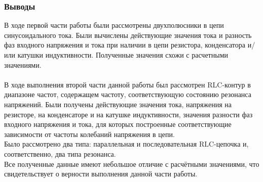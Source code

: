 \documentclass[12pt]{article}
\begin{document}
\subsubsection*{Выводы}
В ходе первой части работы были рассмотрены двухполюсники в цепи синусоидального тока. Были вычислены действующие значения тока и разность фаз входного напряжения и тока при наличии в цепи резистора, конденсатора и/или катушки индуктивности. Полученные значения схожи с расчетными значениями. \\
\ \\
В ходе выполнения второй части данной работы был рассмотрен RLC-контур в диапазоне частот, содержащем частоту, соответствующую состоянию резонанса напряжений. Были получены действующие значения тока, напряжения на резисторе, на конденсаторе и на катушке индуктивности, значения разности фаз входного напряжения и тока, для которых построенные
соответствующие зависимости от частоты колебаний напряжения в цепи. \\
Было рассмотрено два типа: параллельная и последовательная RLC-цепочка и, соответственно, два типа резонанса. \\
Все полученные данные имеют небольшое отличие с расчётными значениями, что свидетельствует о верности выполнения данной части работы.
\end{document}
